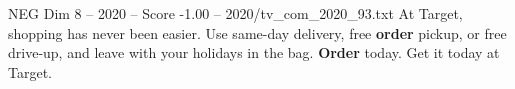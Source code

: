 \begin{textsample}{NEG Dim 8 – 2020 – Score -1.00 – 2020/tv\_com\_2020\_93.txt}  \label{ex:f8_neg_080}
At Target, shopping has never been easier.
Use same-day delivery, free \textbf{order} pickup, or free drive-up, and leave with your holidays in the bag. \textbf{Order} today.
Get it today at Target.

\end{textsample}

